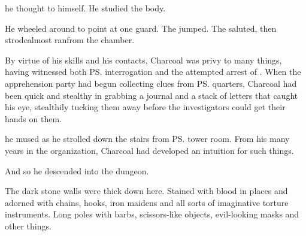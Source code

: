  he thought to himself. 
He studied the body. 

He wheeled around to point at one guard. 
 The \sphyle{} jumped. 
The \sphyle{} saluted, then strode\dash almost ran\dash from the chamber. 






\begin{comment}
\subsection{The dungeon}
\end{comment}

%
By virtue of his skills and his contacts, Charcoal was privy to many things, having witnessed both \Constance{} \ps{\Kintaer} interrogation and the attempted arrest of \Ambrose{} \Onatol. 
When the apprehension party had begun collecting clues from \ps{\Onatol}{} quarters, Charcoal had been quick and stealthy in grabbing a journal and a stack of letters that caught his eye, stealthily tucking them away before the investigators could get their hands on them. 

 he mused as he strolled down the stairs from \ps{\Onatol}{} tower room. 
From his many years in the organization, Charcoal had developed an intuition for such things. 


And so he descended into the dungeon. 

The dark stone walls were thick down here. 
Stained with blood in places and adorned with chains, hooks, iron maidens and all sorts of imaginative torture instruments. 
Long poles with barbs, scissors-like objects, evil-looking masks and other things. 

